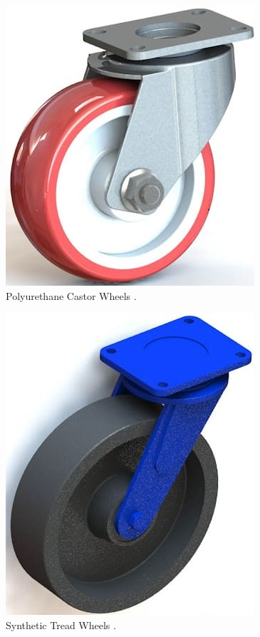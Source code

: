 \begin{figure}[htbp]
\includegraphics[scale=0.3]{Figures/polyurethane-caster-wheel.png}
\centering
\caption[Polyurethane Castor Wheels] {Polyurethane Castor Wheels	 \cite{noauthor_caster_nodate}.}
\label{fig:polyurethanecastorwheels}
\end{figure}

\begin{figure}[htbp]
\includegraphics[scale=0.3]{Figures/synthetic-tread-wheels.jpg}
\centering
\caption[Synthetic Tread Wheels] {Synthetic Tread Wheels	 \cite{noauthor_caster_nodate}.}
\label{fig:synthetictreadwheels}
\end{figure}

